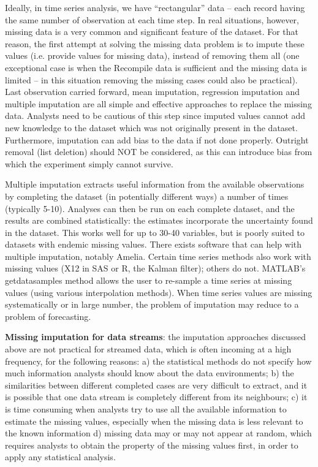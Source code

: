 Ideally, in time series analysis, we have ``rectangular'' data -- each record having the same number of observation at each time step. In real situations, however, missing data is a very common and significant feature of the dataset. For that reason, the first attempt at solving the missing data problem is to impute these values (i.e. provide values for missing data), instead of removing them all (one exceptional case is when the 
  Recompile
data is sufficient and the missing data is limited -- in this situation removing the missing cases could also be practical). Last observation carried forward, mean imputation, regression imputation and multiple imputation are all simple and effective approaches to replace the missing data. Analysts need to be cautious of this step since imputed values cannot add new knowledge to the dataset which was not originally present in the dataset. Furthermore, imputation can add bias to the data if not done properly. Outright removal (list deletion) should NOT be considered, as this can introduce bias from which the experiment simply cannot survive. 
 
Multiple imputation extracts useful information from the available observations by completing the dataset (in potentially different ways) a number of times (typically 5-10). Analyses can then be run on each complete dataset, and the results are combined statistically: the estimates incorporate the uncertainty found in the dataset. This works well for up to 30-40 variables, but is poorly suited to datasets with endemic missing values. There exists software that can help with multiple imputation, notably Amelia. Certain time series methods also work with missing values (X12 in SAS or R, the Kalman filter); others do not. MATLAB's getdatasamples method allows the user to re-sample a time series at missing values (using various interpolation methods). When time series values are missing systematically or in large number, the problem of imputation may reduce to a problem of forecasting.  

\textbf{Missing imputation for data streams}: the imputation approaches discussed above are not practical for streamed data, which is often incoming at a high frequency, for the following reasons: a) the statistical methods do not specify how much information analysts should know about the data environments; b) the similarities between different completed cases are very difficult to extract, and it is possible that one data stream is completely different from its neighbours; c) it is time consuming when analysts try to use all the available information to estimate the missing values, especially when the missing data is less relevant to the known information d) missing data may or may not appear at random, which requires analysts to obtain the property of the missing values first, in order to apply any statistical analysis. 

